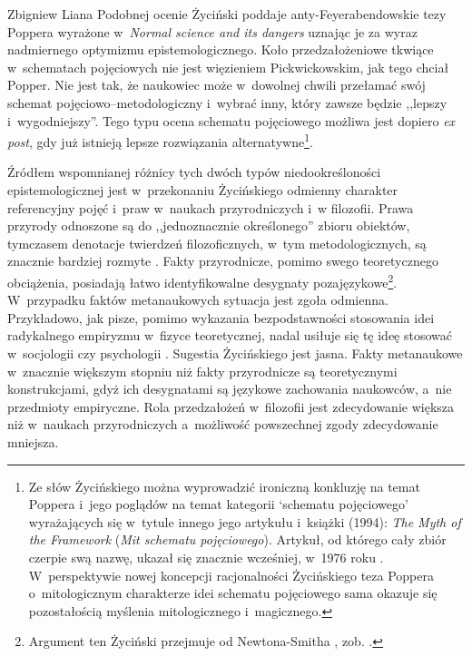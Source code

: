 \begin{artplenv}{Zbigniew Liana}
Podobnej ocenie Życiński
\parencites[][s.~161n]{zycinski_teizm_1985}[][s.~140nn]{zycinski_structure_1988}[][s.~247nn]{zycinski_struktura_2013_liana} %
 poddaje anty-Feyerabendowskie tezy Poppera wyrażone w~\textit{Normal science and its dangers} 
\parencite*[][]{popper_normal_1970} %
 uznając je za wyraz nadmiernego optymizmu epistemologicznego. Koło przedzałożeniowe tkwiące w~schematach pojęciowych nie jest więzieniem Pickwickowskim, jak tego chciał Popper. Nie jest tak, że naukowiec może w~dowolnej chwili przełamać swój schemat pojęciowo–metodologiczny i~wybrać inny, który zawsze będzie ,,lepszy i~wygodniejszy''. Tego typu ocena schematu pojęciowego możliwa jest dopiero \textit{ex post}, gdy już istnieją lepsze rozwiązania alternatywne\footnote{Ze słów Życińskiego można wyprowadzić ironiczną konkluzję na temat Poppera i~jego poglądów na temat kategorii ‘schematu pojęciowego' wyrażających się w~tytule innego jego artykułu i~książki (1994): \textit{The Myth of the Framework} (\textit{Mit schematu pojęciowego}). Artykuł, od którego cały zbiór czerpie swą nazwę, ukazał się znacznie wcześniej, w~1976 roku 
\parencite[zob.][s.~33]{popper_myth_1994}. %
 W~perspektywie nowej koncepcji racjonalności Życińskiego teza Poppera o~mitologicznym charakterze idei schematu pojęciowego sama okazuje się pozostałością myślenia mitologicznego i~magicznego.}.

Źródłem wspomnianej różnicy tych dwóch typów niedookreśloności epistemologicznej jest w~przekonaniu Życińskiego odmienny charakter referencyjny pojęć i~praw w~naukach przyrodniczych i~w filozofii. Prawa przyrody odnoszone są do ,,jednoznacznie określonego'' zbioru obiektów, tymczasem denotacje twierdzeń filozoficznych, w~tym metodologicznych, są znacznie bardziej rozmyte
\parencite[][s.~163]{zycinski_teizm_1985}. %
 Fakty przyrodnicze, pomimo swego teoretycznego obciążenia, posiadają łatwo identyfikowalne desygnaty pozajęzykowe\footnote{Argument ten Życiński przejmuje od Newtona-Smitha 
\parencite*[][s.~179]{newton-smith_rationality_1981}, %
 zob. 
\parencites[][s.~255]{zycinski_elementy_1996}[][s.~346]{zycinski_elementy_2015}.%
}. W~przypadku faktów metanaukowych sytuacja jest zgoła odmienna. Przykładowo, jak pisze, pomimo wykazania bezpodstawności stosowania idei radykalnego empiryzmu w~fizyce teoretycznej, nadal usiłuje się tę ideę stosować w~socjologii czy psychologii 
\parencite[][s.~163]{zycinski_teizm_1985}. %
 Sugestia Życińskiego jest jasna. Fakty metanaukowe w~znacznie większym stopniu niż fakty przyrodnicze są teoretycznymi konstrukcjami, gdyż ich desygnatami są językowe zachowania naukowców, a~nie przedmioty empiryczne. Rola przedzałożeń w~filozofii jest zdecydowanie większa niż w~naukach przyrodniczych a~możliwość powszechnej zgody zdecydowanie mniejsza.


\end{artplenv}
